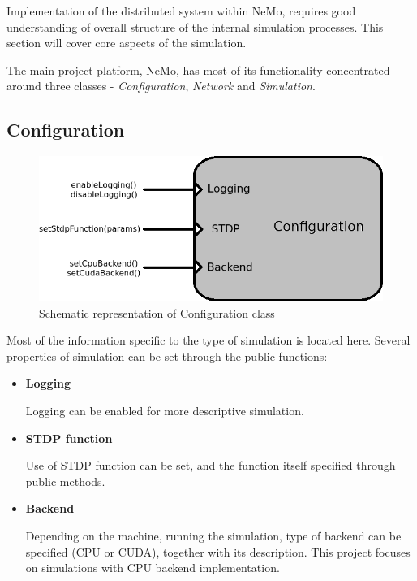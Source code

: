 Implementation of the distributed system within NeMo, requires good understanding of overall structure of the internal simulation processes. This section will cover core aspects of the simulation.

The main project platform, NeMo, has most of its functionality concentrated around three classes - \emph{Configuration}, \emph{Network} and \emph{Simulation}.

\subsection{Configuration}

\begin{figure}[h!]
\begin{center}
\includegraphics[scale = 0.7]{images/configuration_scheme.png}
\end{center}
\caption{Schematic representation of Configuration class}
\end{figure}

Most of the information specific to the type of simulation is located here. Several properties of simulation can be set through the public functions:

\begin{itemize}
\item{\textbf{Logging}}

Logging can be enabled for more descriptive simulation.

\item{\textbf{STDP function}}

Use of STDP function can be set, and the function itself specified through public methods.

\item{\textbf{Backend}}

Depending on the machine, running the simulation, type of backend can be specified (CPU or CUDA), together with its description. This project focuses on simulations with CPU backend implementation.
\end{itemize}

